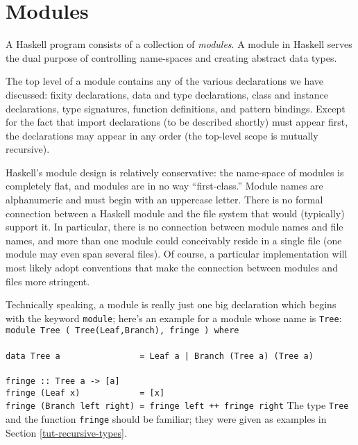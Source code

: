 
\section{Modules}
\label{tut-modules}

A Haskell program consists of a collection of {\em
modules}.  A module in Haskell serves the dual purpose of controlling
name-spaces and creating abstract data types.

The top level of a module contains any of the various declarations we
have discussed: fixity declarations, data and type declarations, class
and instance declarations, type signatures, function definitions, and
pattern bindings.  Except for the fact that 
import declarations (to be described shortly) must appear first, the
declarations may appear in any order (the top-level scope is mutually
recursive).

Haskell's module design is relatively conservative: the name-space of
modules is completely flat, and modules are in no way ``first-class.''
Module names are alphanumeric and must begin with an uppercase letter.
There is no formal connection between a Haskell module and the file
system that would (typically) support it.  In particular, there is no
connection between module names and file names, and more than one
module could conceivably reside in a single file (one module may even
span several files).  Of course, a particular implementation will most
likely adopt conventions that make the connection between modules and
files more stringent.

Technically speaking, a module is really just one big declaration
which begins with the keyword \mbox{\tt module}; here's an example for a module
whose name is \mbox{\tt Tree}:
\bprog
\mbox{\tt module\ Tree\ (\ Tree(Leaf,Branch),\ fringe\ )\ where}\\
\mbox{\tt }\\[-8pt]
\mbox{\tt data\ Tree\ a\ \ \ \ \ \ \ \ \ \ \ \ \ \ \ \ =\ Leaf\ a\ |\ Branch\ (Tree\ a)\ (Tree\ a)\ }\\
\mbox{\tt }\\[-8pt]
\mbox{\tt fringe\ ::\ Tree\ a\ ->\ [a]}\\
\mbox{\tt fringe\ (Leaf\ x)\ \ \ \ \ \ \ \ \ \ \ \ =\ [x]}\\
\mbox{\tt fringe\ (Branch\ left\ right)\ =\ fringe\ left\ ++\ fringe\ right}
\eprog 
The type \mbox{\tt Tree} and the function \mbox{\tt fringe} should be familiar; they
were given as examples in Section \ref{tut-recursive-types}.


